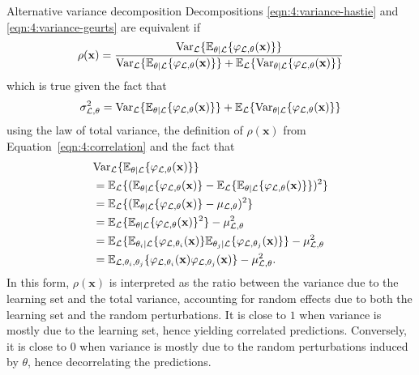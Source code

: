 \begin{remark}{Alternative variance decomposition}
Decompositions \ref{eqn:4:variance-hastie} and \ref{eqn:4:variance-geurts} are equivalent if
\begin{equation}
\rho(\mathbf{x}) = \frac{\text{Var}_{\cal L} \{ \mathbb{E}_{\theta|{\cal L}} \{ \varphi_{{\cal L},\theta}(\mathbf{x}) \} \}}{\text{Var}_{\cal L} \{ \mathbb{E}_{\theta|{\cal L}} \{ \varphi_{{\cal L},\theta}(\mathbf{x}) \} \} + \mathbb{E}_{\cal L} \{ \text{Var}_{\theta|{\cal L}} \{ \varphi_{{\cal L},\theta}(\mathbf{x}) \} \}}
\end{equation}
which is true given the fact that
\begin{equation}
\sigma^2_{{\cal L},\theta} = \text{Var}_{\cal L} \{ \mathbb{E}_{\theta|{\cal L}} \{ \varphi_{{\cal L},\theta}(\mathbf{x}) \} \} + \mathbb{E}_{\cal L} \{ \text{Var}_{\theta|{\cal L}} \{ \varphi_{{\cal L},\theta}(\mathbf{x}) \} \}
\end{equation} using the law of total variance, the definition of $\rho(\mathbf{x})$ from Equation~\ref{eqn:4:correlation} and the fact that
\begin{align}
& \text{Var}_{\cal L} \{ \mathbb{E}_{\theta|{\cal L}} \{ \varphi_{{\cal L},\theta}(\mathbf{x}) \} \} \nonumber \\
&= \mathbb{E}_{\cal L} \{ (\mathbb{E}_{\theta|{\cal L}} \{ \varphi_{{\cal L},\theta}(\mathbf{x}) \} - \mathbb{E}_{\cal L} \{ \mathbb{E}_{\theta|{\cal L}} \{ \varphi_{{\cal L},\theta}(\mathbf{x})\} \})^2 \} \nonumber \\
&= \mathbb{E}_{\cal L} \{ (\mathbb{E}_{\theta|{\cal L}} \{ \varphi_{{\cal L},\theta}(\mathbf{x}) \} - \mu_{{\cal L},\theta})^2 \} \nonumber \\
&= \mathbb{E}_{\cal L} \{ \mathbb{E}_{\theta|{\cal L}} \{ \varphi_{{\cal L},\theta}(\mathbf{x}) \}^2 \} - \mu^2_{{\cal L},\theta} \nonumber \\
&= \mathbb{E}_{\cal L} \{ \mathbb{E}_{\theta_i|{\cal L}} \{ \varphi_{{\cal L},\theta_i}(\mathbf{x}) \} \mathbb{E}_{\theta_j|{\cal L}} \{ \varphi_{{\cal L},\theta_j}(\mathbf{x}) \} \} - \mu^2_{{\cal L},\theta} \nonumber \\
&= \mathbb{E}_{{\cal L},\theta_i,\theta_j} \{ \varphi_{{\cal L},\theta_i}(\mathbf{x}) \varphi_{{\cal L},\theta_j}(\mathbf{x}) \} - \mu^2_{{\cal L},\theta}.
\end{align}
In this form, $\rho(\mathbf{x})$ is interpreted as the ratio between the variance
due to the learning set  and the total variance, accounting for
random effects due to both the learning set and the random perturbations.
It is close to $1$ when variance is mostly due to the learning set, hence
yielding correlated predictions. Conversely, it is close to $0$ when variance
is mostly due to the random perturbations induced by $\theta$, hence decorrelating
the predictions.
\end{remark}

